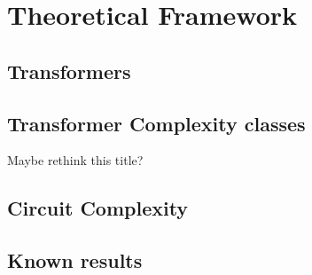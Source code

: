 \chapter{Theoretical Framework}

\section{Transformers}





\section{Transformer Complexity classes}{\color{orange} Maybe rethink this title?}



\section{Circuit Complexity}


\section{Known results}

